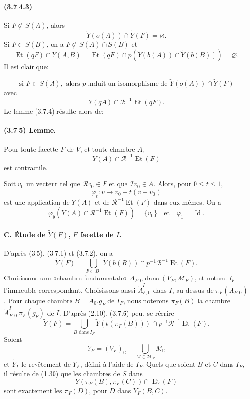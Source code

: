 \documentclass[10pt,a4paper]{article}
\newcommand{\C}{\mathbb C}
\newcommand{\mcR}{\mathcal R}
\newcommand{\mcI}{\mathcal I}
\begin{document}
\paragraph{(3.7.4.3)} Si \(F\not\subset S(A)\), alors
\[
\widetilde Y(o(A))\cap\widetilde Y(F)=\varnothing.
\]
Si \(F\subset S(B)\), on a \(F\not\subset S(A)\cap S(B)\) et
\[
\operatorname{Et}(qF)\cap Y(A,B)
=\operatorname{Et}(qF)\cap p(\widetilde Y(b(A))\cap\widetilde Y(b(B)))=\varnothing.
\]
Il est clair que:

\[
\tag{3.7.4.4}
\text{si }F\subset S(A),\text{ alors }p\text{ induit un isomorphisme de }
\widetilde Y(o(A))\cap\widetilde Y(F)
\]
avec
\[
Y(qA)\cap\mcR^{-1}\operatorname{Et}(qF).
\]
Le lemme (3.7.4) résulte alors de:

\paragraph{(3.7.5) Lemme.} Pour toute facette \(F\) de \(V\), et toute chambre \(A\),
\[
Y(A)\cap\mcR^{-1}\operatorname{Et}(F)
\]
est contractile.

Soit \(v_0\) un vecteur tel que \(\mcR v_0\in F\) et que \(\mcI v_0\in A\). Alors, pour \(0\le t\le1\),
\[
\varphi_t:v\longmapsto v_0+t(v-v_0)
\]
est une application de \(Y(A)\) et de \(\mcR^{-1}\operatorname{Et}(F)\) dans eux-mêmes. On a
\[
\varphi_0(Y(A)\cap\mcR^{-1}\operatorname{Et}(F))=\{v_0\}
\quad\text{et}\quad
\varphi_1=\operatorname{Id}.
\]

\paragraph{C. Étude de \(\widetilde Y(F)\), \(F\) facette de \(I\).} D'après (3.5), (3.7.1) et (3.7.2), on a
\[
\tag{3.7.6}
\widetilde Y(F)=
\bigcup_{F\subset B^-}
\widetilde Y(b(B))\cap p^{-1}\mcR^{-1}\operatorname{Et}(F).
\]
Choisissons une «chambre fondamentale» \(A_{F,0}\) dans \((V_F,\mathcal M_F)\), et notons \(I_F\) l'immeuble correspondant. Choisissons aussi \(\widetilde A^I_{F,0}\) dans \(I\), au-dessus de \(\pi_F(A_{F,0})\). Pour chaque chambre \(B=\widetilde A_0.g_F\) de \(I_F\), nous noterons \(\pi_F(B)\) la chambre \(\widetilde A^I_{F,0}.\pi_F(g_F)\) de \(I\). D'après (2.10), (3.7.6) peut se récrire
\[
\widetilde Y(F)=
\bigcup_{B\text{ dans }I_F}
\widetilde Y(b(\pi_F(B)))\cap p^{-1}\mcR^{-1}\operatorname{Et}(F).
\]
Soient
\[
Y_F=(V_F)_\C-\bigcup_{M\in\mathcal M_F}M_\C
\]
et \(\widetilde Y_F\) le revêtement de \(Y_F\), défini à l'aide de \(I_F\). Quels que soient \(B\) et \(C\) dans \(I_F\), il résulte de (1.30) que les chambres de \(S\) dans
\[
Y(\pi_F(B),\pi_F(C))\cap\operatorname{Et}(F)
\]
sont exactement les \(\pi_F(D)\), pour \(D\) dans \(Y_F(B,C)\).
\end{document}
